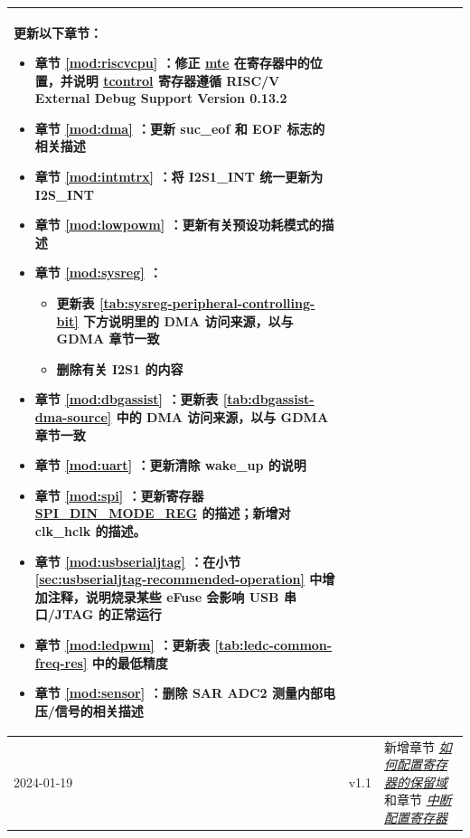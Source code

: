 \begin{longtable}[l]{ | m{2cm} | m{1.5cm} | m{12cm} | }
    更新以下章节：
        \begin{itemize}
            \item 章节 \ref{mod:riscvcpu} \textit{\nameref{mod:riscvcpu}}：修正 \hyperref[fielddesc:TCONTROLMTE]{mte} 在寄存器中的位置，并说明 \hyperref[regdesc:TCONTROL]{tcontrol} 寄存器遵循 RISC\-/V External Debug Support Version 0.13.2
            \item 章节 \ref{mod:dma} \textit{\nameref{mod:dma}}：更新 suc\_eof 和 EOF 标志的相关描述 %
            \item 章节 \ref{mod:intmtrx} \textit{\nameref{mod:intmtrx}}：将 I2S1\_INT 统一更新为 I2S\_INT %
            \item 章节 \ref{mod:lowpowm} \textit{\nameref{mod:lowpowm}}：更新有关预设功耗模式的描述 %
            \item 章节 \ref{mod:sysreg} \textit{\nameref{mod:sysreg}}：
            \begin{itemize}
                \item 更新表 \ref{tab:sysreg-peripheral-controlling-bit} 下方说明里的 DMA 访问来源，以与 GDMA 章节一致 %
                \item 删除有关 I2S1 的内容 %
            \end{itemize}
            \item 章节 \ref{mod:dbgassist} \textit{\nameref{mod:dbgassist}}：更新表 \ref{tab:dbgassist-dma-source} 中的 DMA 访问来源，以与 GDMA 章节一致 %
            \item 章节 \ref{mod:uart} \textit{\nameref{mod:uart}}：更新清除 wake\_up 的说明 %
            \item 章节 \ref{mod:spi} \textit{\nameref{mod:spi}}：更新寄存器 \hyperref[regdesc:SPIDINMODEREG]{SPI\_DIN\_MODE\_REG} 的描述；新增对 clk\_hclk 的描述。 %
            \item 章节 \ref{mod:usbserialjtag} \textit{\nameref{mod:usbserialjtag}}：在小节 \ref{sec:usbserialjtag-recommended-operation} 中增加注释，说明烧录某些 eFuse 会影响 USB 串口/JTAG 的正常运行 %
            \item 章节 \ref{mod:ledpwm} \textit{\nameref{mod:ledpwm}}：更新表 \ref{tab:ledc-common-freq-res} 中的最低精度  %
            \item 章节 \ref{mod:sensor} \textit{\nameref{mod:sensor}}：删除 SAR ADC2 测量内部电压/信号的相关描述 %
        \end{itemize}
    \\\hline
    2024-01-19 & v1.1 &
    新增章节 \hyperref[programming-reserved-field]{\textit{如何配置寄存器的保留域}} 和章节 \hyperref[interrupt-config-registers]{\textit{中断配置寄存器}}


\end{longtable}
